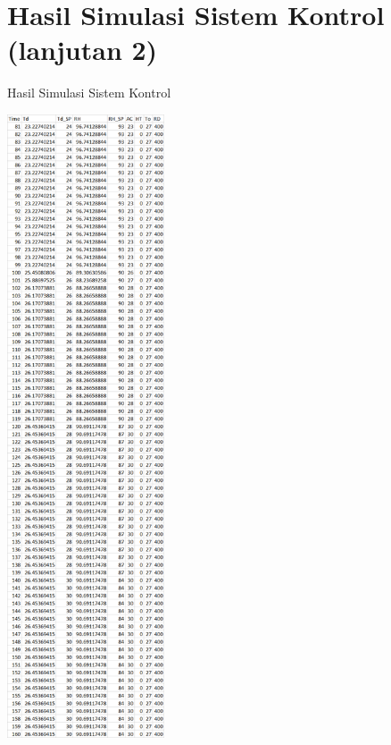 \section{Hasil Simulasi Sistem Kontrol (lanjutan 2)}
\begin{table}[!h]
	\caption{Hasil Simulasi Sistem Kontrol}
	\label{tbl:A:HasilSimulasiKontrol2}
	\centering
	\includegraphics[width=0.35\textwidth]{figures/HasilSimulasiSimulink2}
\end{table}
\break

